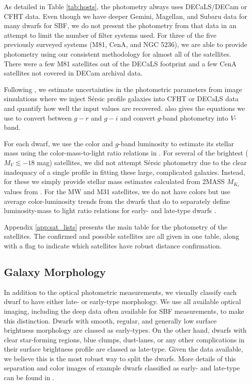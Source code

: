 \documentclass[twocolumn]{aastex62}
\begin{document}
As detailed in Table \ref{tab:hosts}, the photometry always uses DECaLS/DECam or CFHT data. Even though we have deeper Gemini, Magellan, and Subaru data for many dwarfs for SBF, we do not present the photometry from that data in an attempt to limit the number of filter systems used. For three of the five previously surveyed systems (M81, CenA, and NGC 5236), we are able to provide photometry using our consistent methodology for almost all of the satellites. There were a few M81 satellites out of the DECaLS footprint and a few CenA satellites not covered in DECam archival data.

Following \citet{carlsten2021a}, we estimate uncertainties in the photometric parameters from image simulations where we inject S\'{e}rsic profile galaxies into CFHT or DECaLS data and quantify how well the input values are recovered. \citet{carlsten2021a} also gives the equations we use to convert between $g-r$ and $g-i$ and convert $g$-band photometry into $V$-band.

For each dwarf, we use the color and $g$-band luminosity to estimate its stellar mass using the color-mass-to-light ratio relations in \citet{into2013}. For several of the brightest ($M_V\lesssim-18$ mag) satellites, we did not attempt S\'{e}rsic photometry due to the clear inadequacy of a single profile in fitting these large, complicated galaxies. Instead, for these we simply provide stellar mass estimates calculated from 2MASS \citep{2mass} $M_{K_s}$ values from \citet{kourkchi2017}. For the MW and M31 satellites, we do not have colors but use average color-luminosity trends from the dwarfs that do to separately define luminosity-mass to light ratio relations for early- and late-type dwarfs \citep[see Equation 4 of][]{carlsten2021a}.


Appendix \ref{app:sat_lists} presents the main table for the photometry of the satellites. The confirmed and possible satellites are all given in one table, along with a flag to indicate which satellites have robust distance confirmation.


\subsection{Galaxy Morphology}
\label{sec:morph}
In addition to the optical photometric measurements, we visually classify each dwarf to have either late- or early-type morphology. We use all available optical imaging, including the deep data often available for SBF measurements, to make this distinction. Dwarfs with smooth, regular, and generally low surface brightness morphology are classed as early-types. On the other hand, dwarfs with clear star-forming regions, blue clumps, dust-lanes, or any other complications in their surface brightness profile are classed as late-type. Given the data available, we believe this is the most robust way to split the dwarfs. More details of this separation and color images of example dwarfs classified as early- and late-type can be found in \citet{carlsten2021a}. 
\end{document}
